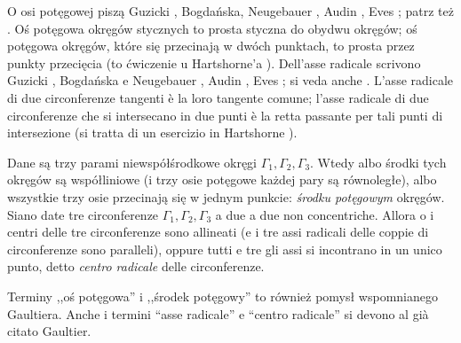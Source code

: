 O osi potęgowej piszą Guzicki \cite[s. 173, 174]{guzicki_2021}, Bogdańska, Neugebauer \cite[s. 69]{neugebauer_2018}, Audin \cite[s. 89]{audin_2003}, Eves \cite[s. 92]{eves1_1972}; patrz też \cite[s. 11]{komisarczyk_2024}. %
Oś potęgowa okręgów stycznych to prosta styczna do obydwu okręgów; oś potęgowa okręgów, które się przecinają w dwóch punktach, to prosta przez punkty przecięcia (to ćwiczenie u Hartshorne'a \cite[s. 182]{hartshorne_2000}). %
Dell'asse radicale scrivono Guzicki \cite[p. 173, 174]{guzicki_2021}, Bogdańska e Neugebauer \cite[p. 69]{neugebauer_2018}, Audin \cite[p. 89]{audin_2003}, Eves \cite[p. 92]{eves1_1972}; si veda anche \cite[p. 11]{komisarczyk_2024}. %
L'asse radicale di due circonferenze tangenti è la loro tangente comune; l'asse radicale di due circonferenze che si intersecano in due punti è la retta passante per tali punti di intersezione (si tratta di un esercizio in Hartshorne \cite[p. 182]{hartshorne_2000}). %

\begin{proposition}
[środek potęgowy] %
[centro radicale] %
	Dane są trzy parami niewspółśrodkowe okręgi $\Gamma_1, \Gamma_2, \Gamma_3$. %
	Wtedy albo środki tych okręgów są współliniowe (i trzy osie potęgowe każdej pary są równoległe), albo wszystkie trzy osie przecinają się w jednym punkcie: \emph{środku potęgowym} okręgów. %
	Siano date tre circonferenze $\Gamma_1, \Gamma_2, \Gamma_3$ a due a due non concentriche. %
	Allora o i centri delle tre circonferenze sono allineati (e i tre assi radicali delle coppie di circonferenze sono paralleli), oppure tutti e tre gli assi si incontrano in un unico punto, detto \emph{centro radicale} delle circonferenze. %
\end{proposition}

Terminy ,,oś potęgowa'' i ,,środek potęgowy'' to również pomysł wspomnianego Gaultiera. %
Anche i termini ``asse radicale'' e ``centro radicale'' si devono al già citato Gaultier. %


